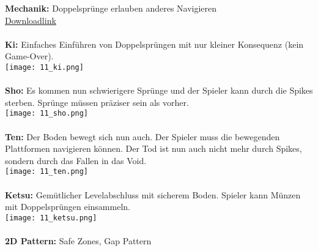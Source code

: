 \documentclass{article}
\begin{document}
\textbf{Mechanik:} Doppelsprünge erlauben anderes Navigieren
\\
\href{https://hsluzern-my.sharepoint.com/:u:/g/personal/david_hodel_stud_hslu_ch/EWiT-lbI3OlHmm16AtbiQrsBpFmHQv5jdMYLqAvznqtalw?e=Had2Mw}{Downloadlink}
\\ \\
\textbf{Ki:} Einfaches Einführen von Doppelsprüngen mit nur kleiner Konsequenz (kein Game-Over).
\\
\texttt{[image: 11\_ki.png]}
\\ \\
\textbf{Sho:} Es kommen nun schwierigere Sprünge und der Spieler kann durch die Spikes sterben. Sprünge müssen präziser sein als vorher.
\\
\texttt{[image: 11\_sho.png]}
\\ \\
\textbf{Ten:} Der Boden bewegt sich nun auch. Der Spieler muss die bewegenden Plattformen navigieren können. Der Tod ist nun auch
nicht mehr durch Spikes, sondern durch das Fallen in das Void.
\\
\texttt{[image: 11\_ten.png]}
\\ \\
\textbf{Ketsu:} Gemütlicher Levelabschluss mit sicherem Boden. Spieler kann Münzen mit Doppelsprüngen einsammeln.
\\
\texttt{[image: 11\_ketsu.png]}
\\ \\
\textbf{2D Pattern:} Safe Zones, Gap Pattern
\end{document}
